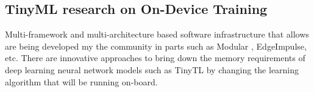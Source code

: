 \subsection{TinyML research on On-Device Training}

Multi-framework and multi-architecture based software infrastructure that allows are being developed my the community in parts such as Modular \cite{mojo}, EdgeImpulse, etc. There are innovative approaches to bring down the memory requirements of deep learning neural network models such as TinyTL \cite{cai2021tinytl} by changing the learning algorithm that will be running on-board.
